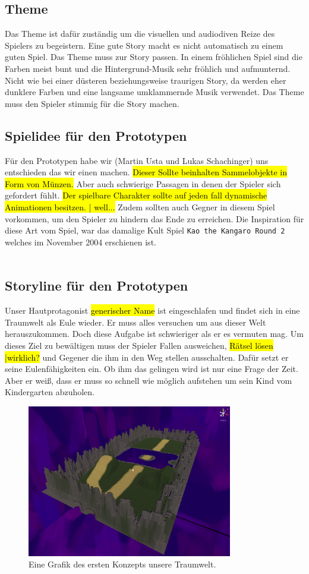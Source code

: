 \subsection{Theme}
Das Theme ist dafür zuständig um die visuellen und audiodiven Reize des Spielers zu begeistern. Eine gute Story macht es nicht automatisch zu einem guten Spiel. Das Theme muss zur Story passen. In einem fröhlichen Spiel sind die Farben meist bunt und die Hintergrund-Musik sehr fröhlich und aufmunternd. Nicht wie bei einer düsteren beziehungsweise traurigen Story, da werden eher dunklere Farben und eine langsame umklammernde Musik verwendet. Das Theme muss den Spieler stimmig für die Story machen.


\subsection{Spielidee für den Prototypen}
Für den Prototypen habe wir (Martin Usta und Lukas Schachinger) uns entschieden das wir einen  machen. \hl{Dieser Sollte beinhalten Sammelobjekte in Form von Münzen.} Aber auch schwierige Passagen in denen der Spieler sich gefordert fühlt. \hl{Der spielbare Charakter sollte auf jeden fall dynamische Animationen besitzen. | well...} Zudem sollten auch Gegner in diesem Spiel vorkommen, um den Spieler zu hindern das Ende zu erreichen. Die Inspiration für diese Art vom Spiel, war das damalige Kult Spiel \verb+Kao the Kangaro Round 2+ welches im November 2004 erschienen ist.\\\\

\subsection{Storyline für den Prototypen}
Unser Hautprotagonist \hl{ generischer Name } ist eingeschlafen und findet sich in eine Traumwelt als Eule wieder. Er muss alles versuchen um aus dieser Welt herauszukommen. Doch diese Aufgabe ist schwieriger als er es vermuten mag. Um dieses Ziel zu bewältigen muss der Spieler Fallen ausweichen, \hl{Rätsel lösen |wirklich?} und Gegener die ihm in den Weg stellen ausschalten. Dafür setzt er seine Eulenfähigkeiten ein. Ob ihm das gelingen wird ist nur eine Frage der Zeit. Aber er weiß, dass er muss so schnell wie möglich aufstehen um sein Kind vom Kindergarten abzuholen.

\begin{figure}[H]
    \centering
    \includegraphics[width=0.8\textwidth]{chapters/15/images/Dreamworld.png}
    \caption{Eine Grafik des ersten Konzepts unsere Traumwelt.}
    \label{UST-7}
\end{figure}

